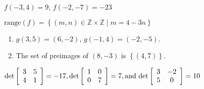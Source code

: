 \begin{list}{\bf{\ref{exer:sec61-7}.}}
\item \begin{list}{\bf{(a)}}
\item $f( { - 3, 4} ) = 9$, $f( { - 2, - 7} ) =  - 23$
\end{list}
\end{list}
%
\begin{list}{}
\item \begin{list}{\bf{(b)}}
\item $\text{range}(f) = \left\{ { {( {m, n} ) \in \mathbb{Z} \times \mathbb{Z} } \mid m = 4 - 3n} \right\}$
\end{list}
\end{list}


\begin{list}{\bf{\ref{exer:sec61-8}.}}
\item \begin{enumerate}
\item $g ( 3, 5 ) = ( 6, -2 )$, \qquad
$g ( -1, 4 ) = ( -2, -5 )$.
\addtocounter{enumi}{1}

\item The set of  preimages of $( 8, -3 )$ is $\left\{ ( 4, 7 ) \right\}$. 


\end{enumerate}

\end{list}



\begin{list}{\bf{\ref{exer:determinant}.}}
\item \begin{list}{\bf{(a)}}
\item $\det \left[ {\begin{array}{*{20}c}
   3 & 5  \\
   4 & 1  \\
\end{array} } \right] =  - 17, \det \left[ {\begin{array}{*{20}c}
   1 & 0  \\
   0 & 7  \\
 \end{array} } \right] = 7, \text{and det}\left[ {\begin{array}{*{20}c}
   3 & { - 2}  \\
   5 & 0  \\
 \end{array} } \right] = 10$
\end{list}
\end{list}

\hbreak
\endinput


